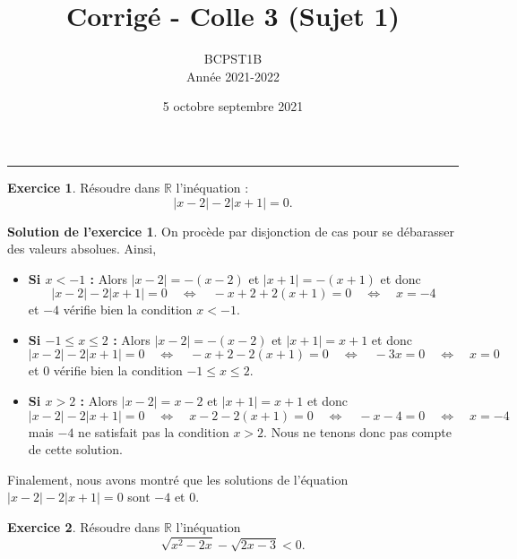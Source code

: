 \documentclass[a4paper, 11pt,openany]{article}%
\title{Corrigé - Colle 3 (Sujet 1)}
\author{BCPST1B\\
Année 2021-2022}
\date{5 octobre septembre 2021}
\theoremstyle{plain}
\theoremstyle{definition}
\newtheorem{exo}{Exercice}
\newtheorem{sol}{Solution de l'exercice}
\theoremstyle{remark}
\newcommand{\R}{\mathbb{R}}
\begin{document}
   \maketitle
      \rule{\linewidth}{0.5mm}



\begin{exo}
Résoudre dans $\R$ l'inéquation :
\[ |x -2| - 2 |x+1| = 0.\]
\end{exo}

\begin{sol}
On procède par disjonction de cas pour se débarasser des valeurs absolues. Ainsi,
\begin{itemize}
\item \textbf{Si $x < -1$ :} Alors $|x-2| = -(x-2)$ et $|x+1| = -(x+1)$ et donc 
\[|x-2| - 2 |x+1| = 0  \quad \Leftrightarrow \quad
-x+2 + 2 (x+1) = 0 \quad \Leftrightarrow \quad
x = -4\]
et $-4$ vérifie bien la condition $x < -1$.
\item \textbf{Si $-1 \leqslant x \leqslant 2$ :} Alors $|x-2| = -(x-2)$ et $|x+1| = x+1$ et donc 
\[|x-2| - 2 |x+1| = 0  \quad \Leftrightarrow \quad
-x+2 - 2 (x+1) = 0 \quad \Leftrightarrow \quad
-3x = 0 \quad \Leftrightarrow \quad
x = 0 \]
et $0$ vérifie bien la condition $-1 \leqslant x \leqslant 2$.
\item \textbf{Si $x > 2$ :} Alors $|x-2| = x-2$ et $|x+1| = x+1$ et donc 
\[|x-2| - 2 |x+1| = 0  \quad \Leftrightarrow \quad
x-2 - 2 (x+1) = 0 \quad \Leftrightarrow \quad
-x -4 = 0 \quad \Leftrightarrow \quad
x = -4 \]
mais $-4$ ne satisfait pas la condition $x > 2$. Nous ne tenons donc pas compte de cette solution.
\end{itemize}
Finalement, nous avons montré que les solutions de l'équation $|x-2| - 2 |x+1| = 0$ sont $-4$ et $0$.
\end{sol}



\begin{exo}
Résoudre dans $\R$ l'inéquation
\[\sqrt{x^2 - 2x} - \sqrt{2x-3} < 0.\]
\end{exo}
\end{document}
